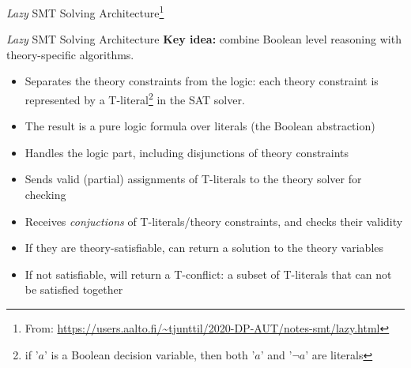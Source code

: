 \documentclass{cons-beamer}
\begin{document}
\begin{frame}{\textit{Lazy} SMT Solving Architecture\footnote{From: \url{https://users.aalto.fi/\~tjunttil/2020-DP-AUT/notes-smt/lazy.html}}}
{
	} %
\end{frame}

\begin{frame}{\textit{Lazy} SMT Solving Architecture}
	\textbf{Key idea:} combine Boolean level reasoning with theory-specific algorithms.
	\vfill
	
	\begin{itemize}
		\item Separates the theory constraints from the logic: each theory constraint is represented by a T-literal\footnote{if '$a$' is a Boolean decision variable, then both '$a$' and '$\neg a$' are literals} in the SAT solver.
		\item The result is a pure logic formula over literals (the Boolean abstraction)
	\end{itemize}
	
	\begin{itemize}
		\item Handles the logic part, including disjunctions of theory constraints
		\item Sends valid (partial) assignments of T-literals to the theory solver for checking
	\end{itemize}
	\pause
	
	\begin{itemize}
		\item Receives \textit{conjuctions} of T-literals/theory constraints, and checks their validity
		\item If they are theory-satisfiable, can return a solution to the theory variables
		\item If not satisfiable, will return a T-conflict: a subset of T-literals that can not be satisfied together
	\end{itemize}
\end{frame}
\end{document}
